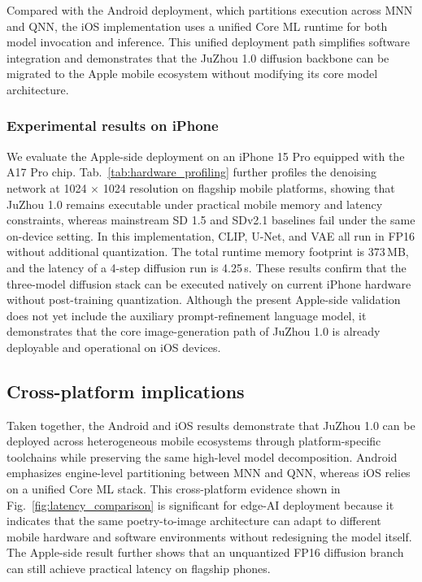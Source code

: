 Compared with the Android deployment, which partitions execution across MNN and QNN, the iOS implementation uses a unified Core ML runtime for both model invocation and inference. This unified deployment path simplifies software integration and demonstrates that the JuZhou 1.0 diffusion backbone can be migrated to the Apple mobile ecosystem without modifying its core model architecture.

\subsubsection{Experimental results on iPhone}

We evaluate the Apple-side deployment on an iPhone 15 Pro equipped with the A17 Pro chip. Tab.~\ref{tab:hardware_profiling} further profiles the denoising network at 1024 $\times$ 1024 resolution on flagship mobile platforms, showing that JuZhou 1.0 remains executable under practical mobile memory and latency constraints, whereas mainstream SD 1.5 and SDv2.1 baselines fail under the same on-device setting. 
In this implementation, CLIP, U-Net, and VAE all run in FP16 without additional quantization. The total runtime memory footprint is 373\,MB, and the latency of a 4-step diffusion run is 4.25\,s.
These results confirm that the three-model diffusion stack can be executed natively on current iPhone hardware without post-training quantization. Although the present Apple-side validation does not yet include the auxiliary prompt-refinement language model, it demonstrates that the core image-generation path of JuZhou 1.0 is already deployable and operational on iOS devices.

\subsection{Cross-platform implications}
Taken together, the Android and iOS results demonstrate that JuZhou 1.0 can be deployed across heterogeneous mobile ecosystems through platform-specific toolchains while preserving the same high-level model decomposition. Android emphasizes engine-level partitioning between MNN and QNN, whereas iOS relies on a unified Core ML stack.
This cross-platform evidence shown in Fig.~\ref{fig:latency_comparison} is significant for edge-AI deployment because it indicates that the same poetry-to-image architecture can adapt to different mobile hardware and software environments without redesigning the model itself. The Apple-side result further shows that an unquantized FP16 diffusion branch can still achieve practical latency on flagship phones.



